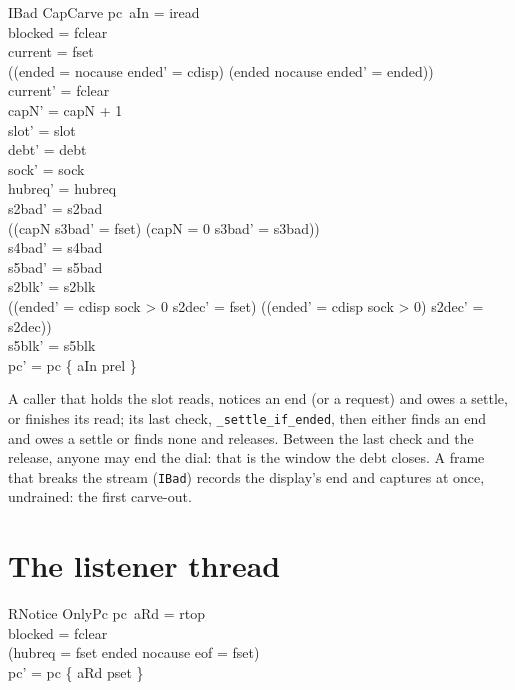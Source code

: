 \documentclass[a4paper,10pt,fleqn]{article}
\begin{document}
\begin{schema}{IBad}
  CapCarve
\where
  pc~aIn = iread \\
  blocked = fclear \\
  current = fset \\
  ((ended = nocause \land ended' = cdisp) \lor (ended \neq nocause \land ended' = ended)) \\
  current' = fclear \\
  capN' = capN + 1 \\
  slot' = slot \\
  debt' = debt \\
  sock' = sock \\
  hubreq' = hubreq \\
  s2bad' = s2bad \\
  ((capN  \land s3bad' = fset) \lor (capN = 0 \land s3bad' = s3bad)) \\
  s4bad' = s4bad \\
  s5bad' = s5bad \\
  s2blk' = s2blk \\
  ((ended' = cdisp \land sock > 0 \land s2dec' = fset) \lor
    (\lnot (ended' = cdisp \land sock > 0) \land s2dec' = s2dec)) \\
  s5blk' = s5blk \\
  pc' = pc \oplus \{ aIn \mapsto prel \}
\end{schema}

A caller that holds the slot reads, notices an end (or a request) and owes a
settle, or finishes its read; its last check, \texttt{\_settle\_if\_ended}, then
either finds an end and owes a settle or finds none and releases.  Between the
last check and the release, anyone may end the dial: that is the window the
debt closes.  A frame that breaks the stream (\texttt{IBad}) records the
display's end and captures at once, undrained: the first carve-out.

\section{The listener thread}

\begin{schema}{RNotice}
  OnlyPc
\where
  pc~aRd = rtop \\
  blocked = fclear \\
  (hubreq = fset \lor ended \neq nocause \lor eof = fset) \\
  pc' = pc \oplus \{ aRd \mapsto pset \}
\end{schema}
\end{document}
